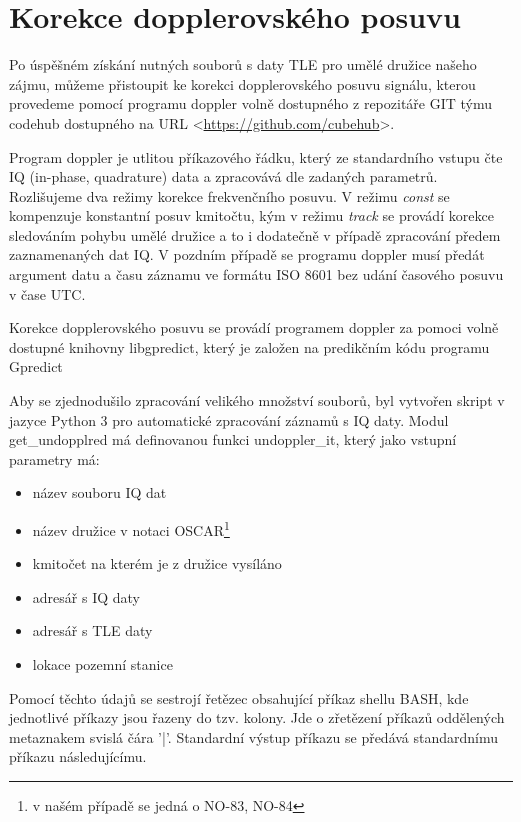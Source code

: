 \section{Korekce dopplerovského posuvu}
  Po úspěšném získání nutných souborů s daty TLE pro umělé družice našeho zájmu, můžeme přistoupit ke korekci dopplerovského posuvu signálu, kterou provedeme pomocí programu doppler volně dostupného z repozitáře GIT týmu codehub dostupného na URL <\url{https://github.com/cubehub}>.

  Program doppler je utlitou příkazového řádku, který ze standardního vstupu čte IQ (in-phase, quadrature) data a zpracovává dle zadaných parametrů. Rozlišujeme dva režimy korekce frekvenčního posuvu. V režimu \emph{const} se kompenzuje konstantní posuv kmitočtu, kým v režimu \emph{track} se provádí korekce sledováním pohybu umělé družice a to i dodatečně v případě zpracování předem zaznamenaných dat IQ. V pozdním případě se programu doppler musí předát argument datu a času záznamu ve formátu ISO 8601 \cite{wiki:timeISO} \cite{github:doppler} bez udání časového posuvu v čase UTC.

  Korekce dopplerovského posuvu se provádí programem doppler za pomoci volně dostupné knihovny libgpredict, který je založen na predikčním kódu programu Gpredict\cite{github:ligpredict}

  Aby se zjednodušilo zpracování velikého množství souborů, byl vytvořen skript v jazyce Python 3 pro automatické zpracování záznamů s IQ daty. Modul get\_undopplred má definovanou funkci undoppler\_it, který jako vstupní parametry má:
  \begin{itemize}
    \item název souboru IQ dat
    \item název družice v notaci OSCAR\footnote{v našém případě se jedná o NO-83, NO-84}
    \item kmitočet na kterém je z družice vysíláno
    \item adresář s IQ daty
    \item adresář s TLE daty
    \item lokace pozemní stanice
  \end{itemize}

  Pomocí těchto údajů se sestrojí řetězec obsahující příkaz shellu BASH, kde jednotlivé příkazy jsou řazeny do tzv. kolony. Jde o zřetězení příkazů oddělených metaznakem svislá čára '|'. Standardní výstup příkazu se předává standardnímu příkazu následujícímu. \cite{book:Brandejs-unix-linux}

